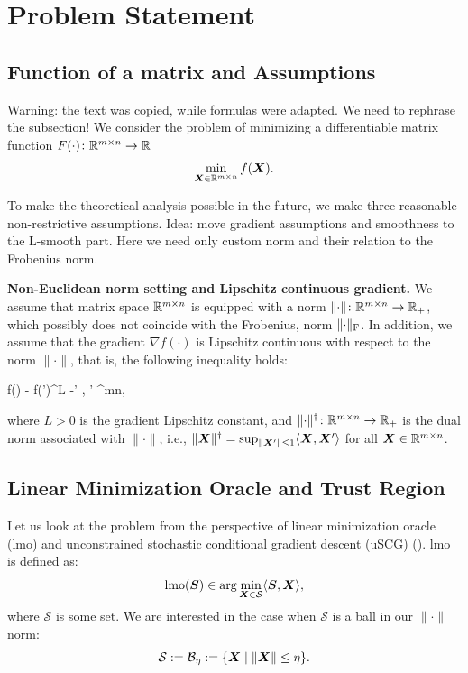\documentclass{article} %
\newcommand{\norm}[1]{\lVert #1\rVert}
\newcommand{\Rmn}{\R^{m\times n}}
\newcommand{\cB}{\mathcal{B}}
\newcommand{\cS}{\mathcal{S}}
\DeclarePairedDelimiter{\normf}{\|}{\|_\mathrm{F}}
\def\<#1,#2>{\langle #1,#2\rangle}
\newcounter{aequation}
\begin{document}
\section{Problem Statement}
\subsection{Function of a matrix and Assumptions}
    Warning: the text was copied, while formulas were adapted. We need to rephrase the subsection! 
    We consider the problem of minimizing a differentiable matrix function $F(\cdot)\colon \Rmn \to \R$
    \begin{equation}\label{eq:mat}
        \min_{\mX \in \Rmn} f(\mX).
    \end{equation}

    To make the theoretical analysis possible in the future, we make three reasonable non-restrictive assumptions.
    Idea: move gradient assumptions and smoothness to the L-smooth part. Here we need only custom norm and their relation to the Frobenius norm.


{\bf Non-Euclidean norm setting and Lipschitz continuous gradient.}
    We assume that matrix space $\Rmn$ is equipped with a norm $\norm{\cdot}\colon \Rmn \to \R_+$, which possibly does not coincide with the Frobenius, norm $\normf{\cdot}$. In addition, we assume that the gradient $\nabla f(\cdot)$ is Lipschitz continuous with respect to the norm $\norm{\cdot}$, that is, the following inequality holds:
    \begin{aequation}\label{eq:L}
    \norm{\nabla f(\mX) - \nabla f(\mX')}^\dagger \leq L \norm{\mX-\mX'}
    \quad{}\;
    \mX, \mX' \in \Rmn,
    \end{aequation}
    where $L > 0$ is the gradient Lipschitz constant, and $\norm{\cdot}^\dagger\colon \Rmn \to \R_+$ is the dual norm associated with $\norm{\cdot}$, i.e., $\norm{\mX}^\dagger = \sup_{\norm{\mX'}\leq 1} \<\mX,\mX'>$ for all $\mX \in \Rmn$.

\subsection{Linear Minimization Oracle and Trust Region}
    Let us look at the problem from the perspective of linear minimization oracle (lmo) and unconstrained stochastic conditional gradient descent (uSCG) (\cite{pethick2025training}). lmo is defined as:
    \begin{equation}\label{eq:lmo}
        \mathrm{lmo}(\mS) \in \arg\min_{\mX \in \cS} \<\mS, \mX>,
    \end{equation}
    where $\cS$ is some set. We are interested in the case when $\cS$ is a ball in our $\norm{\cdot}$ norm:
    \begin{equation}\label{eq:ball}
        \cS := \cB_\eta :=\{ \mX \mid \norm{\mX} \leq \eta \}.
    \end{equation}
\end{document}
